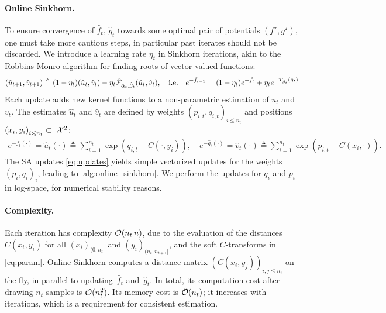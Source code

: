 \paragraph{Online Sinkhorn.}

To ensure convergence of $\hat f_t$, $\hat g_t$ towards some optimal pair of potentials
$(f^\star, g^\star)$, one must take more cautious steps, in particular past iterates should not be discarded. 
%
We introduce a learning
rate $\eta_t$ in Sinkhorn iterations, akin to the Robbins-Monro algorithm for finding
roots of vector-valued functions:
\begin{equation}\label{eq:updates}
    (\hat u_{t+1}, \hat v_{t+1}) \triangleq (1 - \eta_t) (\hat u_t, \hat v_t) 
    - \eta_t \hat \Ff_{\hat \alpha_t, \hat \beta_t}(\hat u_t, \hat v_t),\quad\text{i.e.}\quad
    e^{-\hat f_{t+1}} = (1 - \eta_t) e^{-\hat f_{t}} + 
    \eta_t e^{-\Ctrans{\hat g_t}{\hat \beta_t}}
\end{equation}
Each update adds new kernel functions to a non-parametric estimation of $
u_t$ and $v_t$. The estimates $\hat u_t$ and $\hat v_t$ are defined by weights ${(p_{i,t},
q_{i,t})}_{i \leq n_t}$ and positions ${(x_i, y_i)}_{i \leq n_t} \subset~\Xx^2$:
\begin{align}\label{eq:param}
    e^{-\hat f_t(\cdot)} = \hat u_t(\cdot) \triangleq \sum_{i=1}^{n_t} 
    \exp(q_{i,t} - C(\cdot, y_i)),\quad
    e^{-\hat g_t(\cdot)} = \hat v_t(\cdot) \triangleq \sum_{i=1}^{n_t}
    \exp(p_{i,t} - C(x_i, \cdot)).
\end{align}
The SA updates \eqref{eq:updates} yields simple vectorized updates for the weights
${(p_i,q_i)}_i$, leading to \autoref{alg:online_sinkhorn}. We perform
the updates for $q_i$ and $p_i$ in log-space, for numerical stability reasons.

\paragraph{Complexity.}

Each iteration has complexity $\Oo(n_t\,n)$, due to the evaluation of the
distances $C(x_i, y_i)$ for all $(x_i)_{(0, n_t]}$ and $(y_i)_{(n_t, n_{t+1}]}$,
and the soft $C$-transforms in \eqref{eq:param}. Online Sinkhorn computes a
distance matrix $(C(x_i,y_j))_{i,j \leq n_t}$ on the fly, in parallel to
updating~$\hat f_t$ and~$\hat g_t$. In total, its computation cost after drawing
$n_t$ samples is $\Oo(n_t^2)$. Its memory cost is $\Oo(n_t)$; it increases with
iterations, which is a requirement for consistent estimation.

